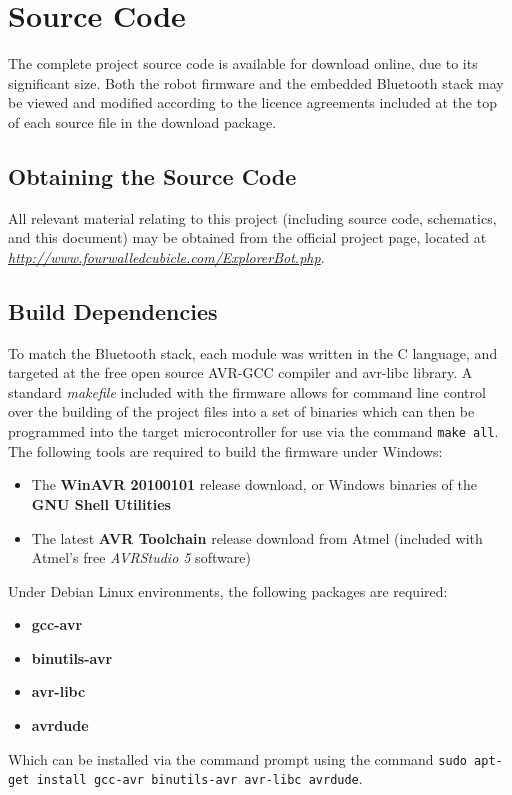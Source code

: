 \chapter{Source Code}
\label{app:sourcecode}

The complete project source code is available for download online, due to its significant size. Both the robot firmware and the embedded Bluetooth stack may be viewed and modified according to the licence agreements included at the top of each source file in the download package.

\section{Obtaining the Source Code}

All relevant material relating to this project (including source code, schematics, and this document) may be obtained from the official project page, located at \\ \href{http://www.fourwalledcubicle.com/ExplorerBot.php}{\textit{http://www.fourwalledcubicle.com/ExplorerBot.php}}.

\section{Build Dependencies}

To match the Bluetooth stack, each module was written in the C language, and targeted at the free open source AVR-GCC compiler and avr-libc library. A standard \textit{makefile} included with the firmware allows for command line control over the building of the project files into a set of binaries which can then be programmed into the target microcontroller for use via the command \texttt{make all}. The following tools are required to build the firmware under Windows:

\begin{itemize}
	\item The \textbf{WinAVR 20100101} release download, or Windows binaries of the \textbf{GNU Shell Utilities}
	\item The latest \textbf{AVR Toolchain} release download from Atmel (included with Atmel's free \textit{AVRStudio 5} software)
\end{itemize}

Under Debian Linux environments, the following packages are required:

\begin{itemize}
	\item \textbf{gcc-avr} 
	\item \textbf{binutils-avr}
	\item \textbf{avr-libc}
	\item \textbf{avrdude}
\end{itemize}

Which can be installed via the command prompt using the command \texttt{sudo apt-get install gcc-avr binutils-avr avr-libc avrdude}.